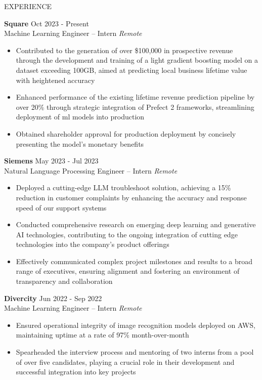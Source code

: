 \documentclass{resume} %
\begin{document}
\begin{rSection}{EXPERIENCE}

    \textbf{Square} \hfill Oct 2023 - Present\\
    Machine Learning Engineer -- Intern \hfill \textit{Remote}
     \begin{itemize}
        \itemsep -3pt {} 
        \item Contributed to the generation of over \$100,000 in prospective revenue through the development and training of a light gradient boosting model on a dataset exceeding 100GB, aimed at predicting local business lifetime value with heightened accuracy
        \item Enhanced performance of the existing lifetime revenue prediction pipeline by over 20\% through strategic integration of Prefect 2 frameworks, streamlining deployment of ml models into production
        \item Obtained shareholder approval for production deployment by concisely presenting the model's monetary benefits
     \end{itemize}
     
    \textbf{Siemens} \hfill May 2023 - Jul 2023\\
    Natural Language Processing Engineer -- Intern \hfill \textit{Remote}
     \begin{itemize}
        \itemsep -3pt {} 
        \item Deployed a cutting-edge LLM troubleshoot solution, achieving a 15\% reduction in customer complaints by enhancing the accuracy and response speed of our support systems
        \item Conducted comprehensive research on emerging deep learning and generative AI technologies, contributing to the ongoing integration of cutting edge technologies into the company's product offerings
        \item Effectively communicated complex project milestones and results to a broad range of executives, ensuring alignment and fostering an environment of transparency and collaboration
     \end{itemize}
    
    \textbf{Divercity} \hfill Jun 2022 - Sep 2022\\
    Machine Learning Engineer -- Intern \hfill \textit{Remote}
     \begin{itemize}
        \itemsep -3pt {} 
        \item Ensured operational integrity of image recognition models deployed on AWS, maintaining uptime at a rate of 97\% month-over-month
        \item Spearheaded the interview process and mentoring of two interns from a pool of over five candidates, playing a crucial role in their development and successful integration into key projects
     \end{itemize}
    
    \end{rSection}
    
\end{document}
